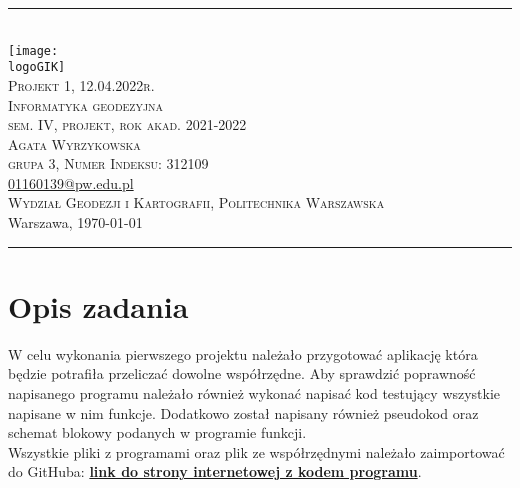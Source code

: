 \documentclass[10pt,a4paper]{article}
\makeatletter
\newcommand{\logoGIK}{settings/WGiK-znak.png}
\newcommand{\authorName}{Agata Wyrzykowska  \\ grupa 3, Numer Indeksu: 312109}
\newcommand{\titeReport}{Projekt 1, 12.04.2022r.}
\newcommand{\titleLecture}{Informatyka geodezyjna \\ sem. IV, projekt, rok akad. 2021-2022}
\newcommand{\mymail}{\href{mailto:01160139@pw.edu.pl}{01160139@pw.edu.pl}}
\newcommand{\faculty}{Wydział Geodezji i Kartografii}
\newcommand{\university}{Politechnika Warszawska}
\newcommand{\city}{Warszawa}
\makeatother
\begin{document}
	\begin{center} 
		\rule{\textwidth}{.5pt} \\
		\vspace{1.0cm} %
		\texttt{[image: \\logoGIK]}
		\vspace{0.5cm} \\
		\Large \textsc{\titeReport}
		\vspace{0.5cm} \\  
		\large \textsc{\titleLecture}
		\vspace{0.5cm}\\
		\textsc{\authorName}  \\
		\mymail \\
		\textsc{\faculty}, \textsc{\university}  \\ 
		\city, \today
	\end{center} 
	\rule{\textwidth}{1.5pt}
	
	
	\tableofcontents 								%
	\newpage
	
	\section{Opis zadania}
	
	W celu wykonania pierwszego projektu należało przygotować aplikację która będzie potrafiła przeliczać dowolne współrzędne. Aby sprawdzić poprawność napisanego programu należało również wykonać napisać kod testujący wszystkie napisane w nim funkcje. Dodatkowo został napisany również pseudokod oraz schemat blokowy podanych w programie funkcji. \\
	Wszystkie pliki z programami oraz plik ze współrzędnymi należało zaimportować do GitHuba: \href{https://github.com/jkluvm/informatykaprojekt1}{\textbf{link do strony internetowej z kodem programu}}.
	
\end{document}
